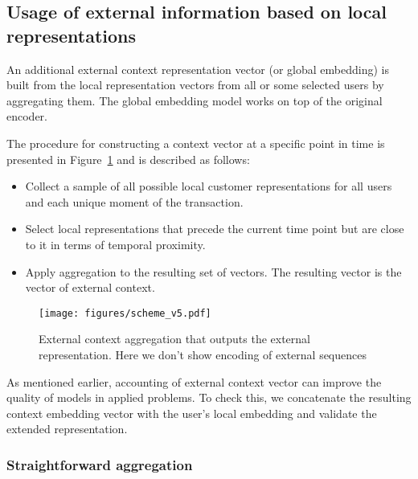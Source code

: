 
\subsection{Usage of external information based on local representations}
\label{sec:global_context_methods}

An additional external context representation vector (or global embedding) is built from the local representation vectors from all or some selected users by aggregating them. 
The global embedding model works on top of the original encoder.

The procedure for constructing a context vector at a specific point in time is presented in Figure~\ref{fig:global_pooling} and is described as follows:
\begin{itemize}
     \item [1.] Collect a sample of all possible local customer representations for all users and each unique moment of the transaction.
     \item [2.] Select local representations that precede the current time point but are close to it in terms of temporal proximity.
     \item [3.] Apply aggregation to the resulting set of vectors. The resulting vector is the vector of external context.
\end{itemize}

\begin{figure}[t!]
     \centering
     \texttt{[image: figures/scheme\_v5.pdf]}     
     \caption{External context aggregation that outputs the external representation. Here we don't show encoding of external sequences}
     \label{fig:global_pooling}
\end{figure}

As mentioned earlier, accounting of external context vector  can improve the quality of models in applied problems. To check this, we concatenate the resulting context embedding vector with the user’s local embedding and validate the extended representation.

\subsubsection{Straightforward aggregation}

